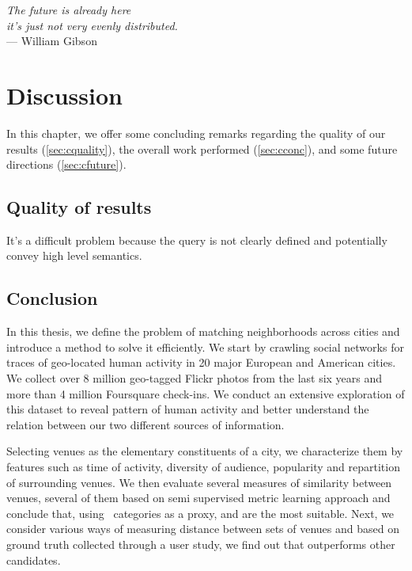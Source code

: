 \begin{flushright}{\slshape    
		The future is already here \\
		it's just not very evenly distributed.
    } \\ \medskip
    --- William Gibson
\end{flushright}

\bigskip

\begingroup
\let\clearpage\relax
\let\cleardoublepage\relax
\let\cleardoublepage\relax
\chapter{Discussion}
\label{chap:discussion}

In this chapter, we offer some concluding remarks regarding the quality of our
results (\autoref{sec:cquality}), the overall work performed
(\autoref{sec:cconc}), and some future directions (\autoref{sec:cfuture}).

\section{Quality of results}
\label{sec:cquality}

It's a difficult problem because the query is not clearly defined and
potentially convey high level semantics.

\section{Conclusion}
\label{sec:cconc}

In this thesis, we define the problem of matching neighborhoods across cities
and introduce a method to solve it efficiently. We start by crawling social
networks for traces of geo-located human activity in 20 major European and
American cities. We collect over 8 million geo-tagged Flickr photos from the
last six years and more than 4 million Foursquare check-ins. We conduct an
extensive exploration of this dataset to reveal pattern of human activity and
better understand the relation between our two different sources of
information.

Selecting venues as the elementary constituents of a city, we characterize them
by features such as time of activity, diversity of audience, popularity and
repartition of surrounding venues. We then evaluate several measures of
similarity between venues, several of them based on semi supervised metric
learning approach and conclude that, using \fs\ categories as a proxy, \eucl{}
and \lmnn{} are the most suitable. Next, we consider various ways of measuring
distance between sets of venues and based on ground truth collected through a
user study, we find out that \emd{} outperforms other candidates.

